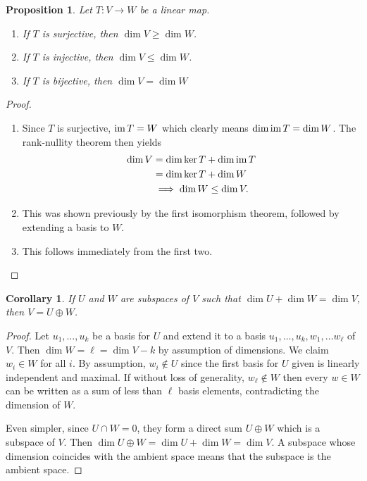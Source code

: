 \documentclass[12pt]{article}
\theoremstyle{definition}
\theoremstyle{plain}
\newtheorem{proposition}[theorem] {Proposition}
\newtheorem{corollary}[theorem]{Corollary}
\numberwithin{equation}{section}
\theoremstyle{definition}
\begin{document}
\begin{proposition}
Let $ T: V \to W $ be a linear map.
\begin{enumerate}
\item If $ T $ is surjective, then $ \dim V \geq \dim W $.
\item If $ T $ is injective, then $ \dim V \leq \dim W $.
\item If $ T $ is bijective, then $ \dim V = \dim W $
\end{enumerate}
\end{proposition}

\begin{proof}
\begin{enumerate}
\item Since $ T $ is surjective, $ \operatorname{im} T = W $ which clearly means $ \dim \operatorname{im} T = \dim W $. The rank-nullity theorem then yields
\begin{align*}
	\dim V &= \dim \ker T + \dim \operatorname{im} T\\
	&= \dim \ker T + \dim W\\
	&\implies \dim W \leq \dim V.
\end{align*}

\item This was shown previously by the first isomorphism theorem, followed by extending a basis to $ W $.

\item This follows immediately from the first two.
\end{enumerate}
\end{proof}

\begin{corollary}\label{directDim}
If $ U $ and $ W $ are subspaces of $ V $ such that $ \dim U + \dim W = \dim V $, then $ V = U \oplus W $.
\end{corollary}

\begin{proof}
Let $ u_1, \ldots, u_k $ be a basis for $ U $ and extend it to a basis $ u_1, \ldots, u_k, w_1, \ldots w_\ell $ of $ V $. Then $ \dim W = \ell = \dim V - k$ by assumption of dimensions. We claim $ w_i \in W $ for all $ i $. By assumption, $ w_i \notin U $ since the first basis for $ U $ given is linearly independent and maximal. If without loss of generality, $ w_\ell \notin W $ then every $ w \in W $ can be written as a sum of less than $ \ell $ basis elements, contradicting the dimension of $ W $.

Even simpler, since $ U \cap W = 0 $, they form a direct sum $ U \oplus W $ which is a subspace of $ V $. Then $ \dim U \oplus W = \dim U + \dim W = \dim V $. A subspace whose dimension coincides with the ambient space means that the subspace is the ambient space.
\end{proof}
\end{document}
